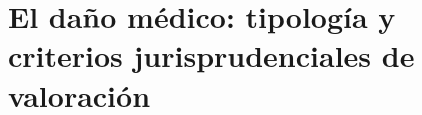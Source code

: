 %
%

\section{El daño médico: tipología y criterios jurisprudenciales de valoración}
\label{sec:dano_medico}

